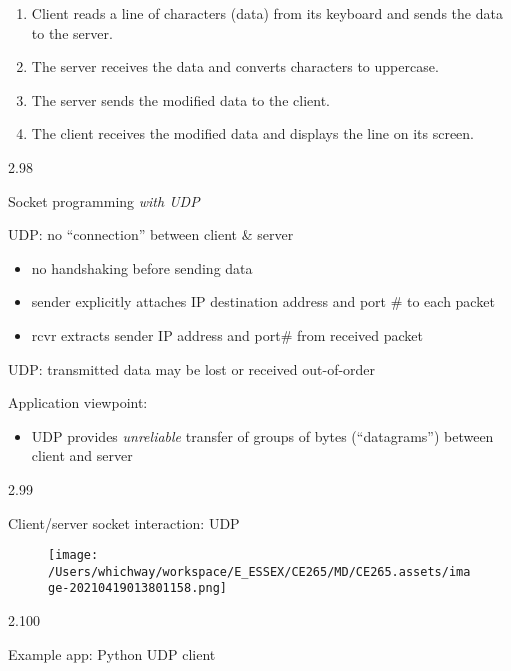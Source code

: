 \documentclass[
]{article}
\begin{document}
\begin{enumerate}
\def\labelenumi{\arabic{enumi}.}
\item
  Client reads a line of characters (data) from its keyboard and sends
  the data to the server.
\item
  The server receives the data and converts characters to uppercase.
\item
  The server sends the modified data to the client.
\item
  The client receives the modified data and displays the line on its
  screen.
\end{enumerate}

2.98

Socket programming \emph{with UDP}

UDP: no ``connection'' between client \& server

\begin{itemize}
\item
  no handshaking before sending data
\item
  sender explicitly attaches IP destination address and port \# to each
  packet
\item
  rcvr extracts sender IP address and port\# from received packet
\end{itemize}

UDP: transmitted data may be lost or received out-of-order

Application viewpoint:

\begin{itemize}
\item
  UDP provides \emph{unreliable} transfer of groups of bytes
  (``datagrams'') between client and server
\end{itemize}

2.99

Client/server socket interaction: UDP

\begin{figure}
\centering
\texttt{[image: /Users/whichway/workspace/E\_ESSEX/CE265/MD/CE265.assets/image-20210419013801158.png]}
\caption{}
\end{figure}

2.100

Example app: Python UDP client
\end{document}
